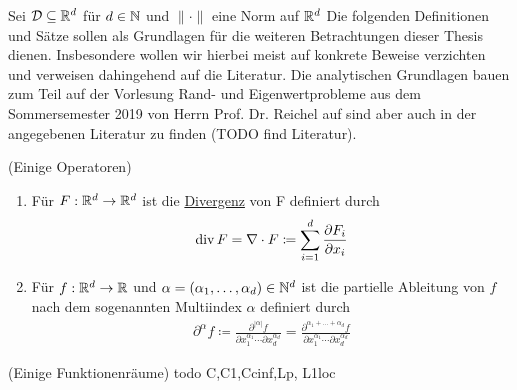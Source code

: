 Sei $\mathcal{D} \subseteq \mathbb{R}^d$ für $d\in \mathbb{N}$ und $\lVert \cdot \rVert$ eine Norm auf $\mathbb{R}^d$
Die folgenden Definitionen und Sätze sollen als Grundlagen für die weiteren Betrachtungen dieser Thesis dienen. Insbesondere wollen wir hierbei meist auf konkrete Beweise verzichten und verweisen dahingehend auf die Literatur. 
Die analytischen Grundlagen bauen zum Teil auf der Vorlesung Rand- und Eigenwertprobleme aus dem Sommersemester 2019 von Herrn Prof. Dr. Reichel auf sind aber auch in der angegebenen Literatur zu finden (TODO find Literatur).
\begin{Definition}(Einige Operatoren)
	\begin{enumerate}
		\item Für $F: \mathbb{R}^d \to \mathbb{R}^d$ ist die \underline{Divergenz} von F definiert durch
			\begin{align*}
				\operatorname{div} F = \nabla \cdot F \coloneqq \sum_{i=1}^{d} \frac{\partial F_i}{ \partial x_i}
			\end{align*}
		\item Für $f: \mathbb{R}^d \to \mathbb{R}$ und $\alpha = (\alpha_1,\dots,\alpha_d) \in \mathbb{N}^d$ ist die partielle Ableitung von $f$ nach dem sogenannten Multiindex $\alpha$ definiert durch
			\begin{align*}
				\partial^{\alpha}f \coloneqq 
				\frac{\partial^{|\alpha|} f}{\partial x_1 ^{\alpha_1} \cdots  \partial x_d^{\alpha_d} } 
				=\frac{\partial^{\alpha_1+\dots +\alpha_d} f}{\partial x_1 ^{\alpha_1} \cdots  \partial x_d^{\alpha_d} } 
			\end{align*}
	\end{enumerate}
\end{Definition}

\begin{Definition}(Einige Funktionenräume)
	todo C,C1,Ccinf,Lp, L1loc
\end{Definition}

